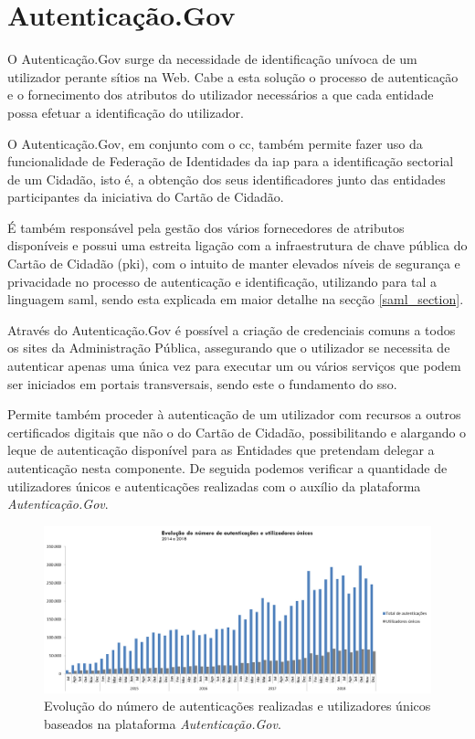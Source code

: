 \cleardoublepage
\section{Autenticação.Gov} \label{infoAuthGov}

O Autenticação.Gov surge da necessidade de identificação unívoca de um utilizador perante sítios na Web. Cabe a esta solução o processo de autenticação e o fornecimento dos atributos do utilizador necessários a que cada entidade possa efetuar a identificação do utilizador.

O Autenticação.Gov, em conjunto com o \gls{cc}, também permite fazer uso da funcionalidade de Federação de Identidades da \gls{iap} para a identificação sectorial de um Cidadão, isto é, a obtenção dos seus identificadores junto das entidades participantes da iniciativa do Cartão de Cidadão. 

É também responsável pela gestão dos vários fornecedores de atributos disponíveis e possui uma estreita ligação com a infraestrutura de chave pública do Cartão de Cidadão (\gls{pki}), com o intuito de manter elevados níveis de segurança e privacidade no processo de autenticação e identificação, utilizando para tal a linguagem \gls{saml}, sendo esta explicada em maior detalhe na secção \ref{saml_section}.

Através do Autenticação.Gov é possível a criação de credenciais comuns a todos os sites da Administração Pública, assegurando que o utilizador se necessita de autenticar apenas uma única vez para executar um ou vários serviços que podem ser iniciados em portais transversais, sendo este o fundamento do \gls{sso}.

Permite também proceder à autenticação de um utilizador com recursos a outros certificados digitais que não o do Cartão de Cidadão, possibilitando e alargando o leque de autenticação disponível para as Entidades que pretendam delegar a autenticação nesta componente. De seguida podemos verificar a quantidade de utilizadores únicos e autenticações realizadas com o auxílio da plataforma \emph{Autenticação.Gov}.

\begin{figure}[h]
    \centering
    \includegraphics[width=\textwidth]{img/authgov/authgovusage.png}
    \caption{Evolução do número de autenticações realizadas e utilizadores únicos baseados na plataforma \emph{Autenticação.Gov}.\cite{authGovStats}}
\end{figure}

